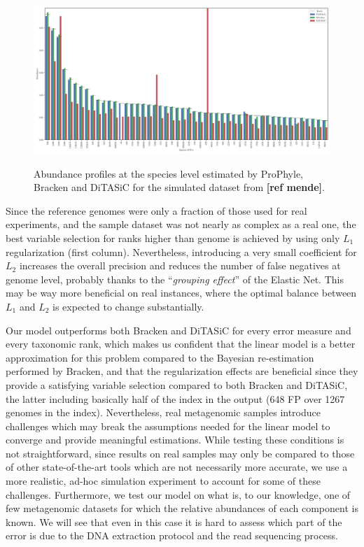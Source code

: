 \begin{figure}
  \caption{Abundance profiles at the species level estimated by ProPhyle, Bracken and DiTASiC for the simulated dataset from \textbf{[ref mende]}.}
  \centering
    \includegraphics[width=1\textwidth]{Figures/ab_mende.pdf}
  \label{ab_mende}
\end{figure}

Since the reference genomes were only a fraction of those used for real experiments, and the sample dataset was not nearly as complex as a real one, the best variable selection for ranks higher than genome is achieved by using only $L_1$ regularization (first column).
Nevertheless, introducing a very small coefficient for $L_2$ increases the overall precision and reduces the number of false negatives at genome level, probably thanks to the ``\textit{grouping effect}'' of the Elastic Net. This may be way more beneficial on real instances, where the optimal balance between $L_1$ and $L_2$ is expected to change substantially.

Our model outperforms both Bracken and DiTASiC for every error measure and every taxonomic rank, which makes us confident that the linear model is a better approximation for this problem compared to the Bayesian re-estimation performed by Bracken, and that the regularization effects are beneficial since they provide a satisfying variable selection compared to both Bracken and DiTASiC, the latter including basically half of the index in the output (648 FP over 1267 genomes in the index). Nevertheless, real metagenomic samples introduce challenges which may break the assumptions needed for the linear model to converge and provide meaningful estimations. While testing these conditions is not straightforward, since results on real samples may only be compared to those of other state-of-the-art tools which are not necessarily more accurate, we use a more realistic, ad-hoc simulation experiment to account for some of these challenges. Furthermore, we test our model on what is, to our knowledge, one of few metagenomic datasets for which the relative abundances of each component is known. We will see that even in this case it is hard to assess which part of the error is due to the DNA extraction protocol and the read sequencing process.


